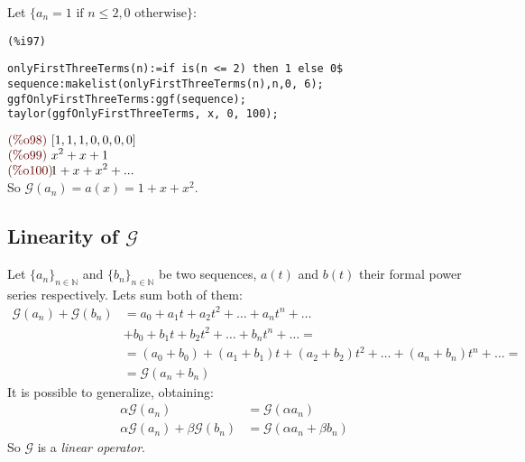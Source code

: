 Let $\{a_n = 1 \text{ if } n \leq 2,  0 \text{ otherwise}\}$:\\
\noindent
\begin{minipage}[t]{8ex}{\color{red}\bf
\begin{verbatim}
(%i97) 
\end{verbatim}}
\end{minipage}
\begin{minipage}[t]{\textwidth}{\color{blue}
\begin{verbatim}
onlyFirstThreeTerms(n):=if is(n <= 2) then 1 else 0$
sequence:makelist(onlyFirstThreeTerms(n),n,0, 6);
ggfOnlyFirstThreeTerms:ggf(sequence);
taylor(ggfOnlyFirstThreeTerms, x, 0, 100);
\end{verbatim}}
\end{minipage}
\begin{math}\displaystyle
\parbox{8ex}{\color{labelcolor}(\%o98) }
[1,1,1,0,0,0,0]
\end{math}\\
\begin{math}\displaystyle
\parbox{8ex}{\color{labelcolor}(\%o99) }
{x}^{2}+x+1
\end{math}\\
\begin{math}\displaystyle
\parbox{8ex}{\color{labelcolor}(\%o100) }
1+x+{x}^{2}+...
\end{math}\\
So $\mathcal{G}(a_n) =a(x)=1+{x}+{x}^{2}$.\\

\subsection{Linearity of $\mathcal{G} $}
Let $\{a_n\}_{n\in\mathbb{N} }$ and $\{b_n\}_{n\in\mathbb{N} } $ be
two sequences, $a(t)$ and $b(t)$ their formal power series
respectively. Lets sum both of them:
\begin{displaymath}
  \begin{split}
    \mathcal{G} (a_n)+ \mathcal{G} (b_n) &= a_0 + a_1 t
    + a_2 t^2 + \ldots + a_n t^n + \ldots \\
    &+ b_0 + b_1 t + b_2 t^2 + \ldots + b_n t^n + \ldots =\\
    &= (a_0 + b_0) + (a_1+b_1) t + (a_2 + b_2) t^2 + \ldots +
    (a_n+b_n) t^n + \ldots =\\
    &= \mathcal{G}(a_n + b_n) 
  \end{split}
\end{displaymath}
It is possible to generalize, obtaining:
\begin{displaymath}
  \begin{split}
    \alpha\mathcal{G}(a_n) &= \mathcal{G}(\alpha a_n)\\
    \alpha\mathcal{G}(a_n) +  \beta\mathcal{G}(b_n) &=
    \mathcal{G}(\alpha a_n + \beta b_n) 
  \end{split}
\end{displaymath}
So $\mathcal{G}$ is a \emph{linear operator}.

